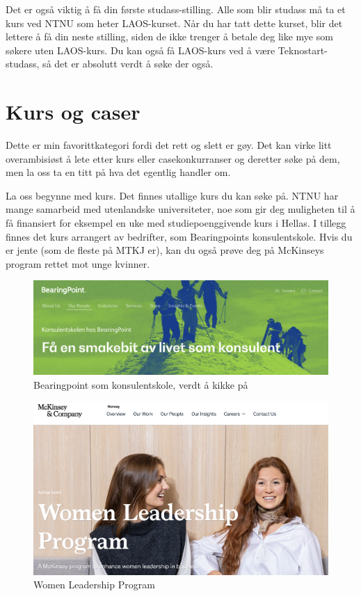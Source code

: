 Det er også viktig å få din første studass-stilling. Alle som blir studass må ta et kurs ved NTNU som heter LAOS-kurset. Når du har tatt dette kurset, blir det lettere å få din neste stilling, siden de ikke trenger å betale deg like mye som søkere uten LAOS-kurs. Du kan også få LAOS-kurs ved å være Teknostart-studass, så det er absolutt verdt å søke der også.



\section{Kurs og caser}

Dette er min favorittkategori fordi det rett og slett er gøy. Det kan virke litt overambisiøst å lete etter kurs eller casekonkurranser og deretter søke på dem, men la oss ta en titt på hva det egentlig handler om.

La oss begynne med kurs. Det finnes utallige kurs du kan søke på. NTNU har mange samarbeid med utenlandske universiteter, noe som gir deg muligheten til å få finansiert for eksempel en uke med studiepoenggivende kurs i Hellas. I tillegg finnes det kurs arrangert av bedrifter, som Bearingpoints konsulentskole. Hvis du er jente (som de fleste på MTKJ er), kan du også prøve deg på McKinseys program rettet mot unge kvinner.

\begin{figure}[H]
    \centering
    \includegraphics[width=1\linewidth]{images/bearingpojnt.png}
    \caption{Bearingpoint som konsulentskole, verdt å kikke på}
    \label{fig:Beairngpoint}
\end{figure}

\begin{figure}[H]
    \centering
    \includegraphics[width=0.8\linewidth]{images/mckinsey.png}
    \caption{Women Leadership Program}
    \label{fig:enter-label}
\end{figure}

